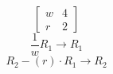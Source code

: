 $$\left[\begin{matrix}w & 4\\r & 2\end{matrix}\right]$$
$$\frac1{w} R_{1} \rightarrow R_{1}$$
$$R_{2} - (r) \cdot R_{1} \rightarrow R_{2}$$
